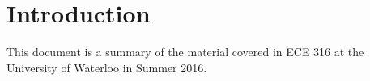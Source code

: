 \documentclass[12pt]{article}
\begin{document}
\section{Introduction}
This document is a summary of the material covered in ECE 316 at the University of Waterloo in Summer 2016.
\end{document}
